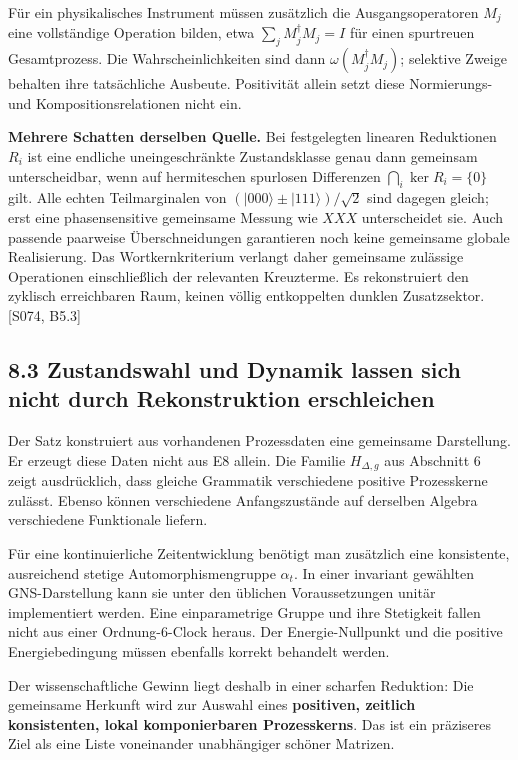 Für ein physikalisches Instrument müssen zusätzlich die
Ausgangsoperatoren \(M_j\) eine vollständige Operation bilden, etwa
\(\sum_jM_j^\dagger M_j=I\) für einen spurtreuen Gesamtprozess. Die
Wahrscheinlichkeiten sind dann \(\omega(M_j^\dagger M_j)\); selektive
Zweige behalten ihre tatsächliche Ausbeute. Positivität allein setzt
diese Normierungs- und Kompositionsrelationen nicht ein.

\textbf{Mehrere Schatten derselben Quelle.} Bei festgelegten linearen
Reduktionen \(R_i\) ist eine endliche uneingeschränkte Zustandsklasse
genau dann gemeinsam unterscheidbar, wenn auf hermiteschen spurlosen
Differenzen \(\bigcap_i\ker R_i=\{0\}\) gilt. Alle echten Teilmarginalen
von \((|000\rangle\pm|111\rangle)/\sqrt2\) sind dagegen gleich; erst
eine phasensensitive gemeinsame Messung wie \(XXX\) unterscheidet sie.
Auch passende paarweise Überschneidungen garantieren noch keine
gemeinsame globale Realisierung. Das Wortkernkriterium verlangt daher
gemeinsame zulässige Operationen einschließlich der relevanten
Kreuzterme. Es rekonstruiert den zyklisch erreichbaren Raum, keinen
völlig entkoppelten dunklen Zusatzsektor. {[}S074, B5.3{]}

\subsection{8.3 Zustandswahl und Dynamik lassen sich nicht durch
Rekonstruktion
erschleichen}\label{zustandswahl-und-dynamik-lassen-sich-nicht-durch-rekonstruktion-erschleichen}

Der Satz konstruiert aus vorhandenen Prozessdaten eine gemeinsame
Darstellung. Er erzeugt diese Daten nicht aus E8 allein. Die Familie
\(H_{\Delta,g}\) aus Abschnitt 6 zeigt ausdrücklich, dass gleiche
Grammatik verschiedene positive Prozesskerne zulässt. Ebenso können
verschiedene Anfangszustände auf derselben Algebra verschiedene
Funktionale liefern.

Für eine kontinuierliche Zeitentwicklung benötigt man zusätzlich eine
konsistente, ausreichend stetige Automorphismengruppe \(\alpha_t\). In
einer invariant gewählten GNS-Darstellung kann sie unter den üblichen
Voraussetzungen unitär implementiert werden. Eine einparametrige Gruppe
und ihre Stetigkeit fallen nicht aus einer Ordnung-6-Clock heraus. Der
Energie-Nullpunkt und die positive Energiebedingung müssen ebenfalls
korrekt behandelt werden.

Der wissenschaftliche Gewinn liegt deshalb in einer scharfen Reduktion:
Die gemeinsame Herkunft wird zur Auswahl eines \textbf{positiven,
zeitlich konsistenten, lokal komponierbaren Prozesskerns}. Das ist ein
präziseres Ziel als eine Liste voneinander unabhängiger schöner
Matrizen.

